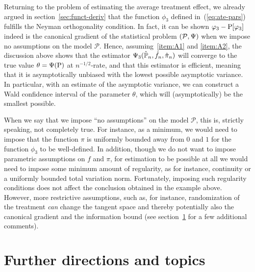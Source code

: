 \documentclass[a4,danish]{article}
\begin{document}
\begin{example}
  \label{example:effi-ate}
  Returning to the problem of estimating the average treatment effect, we already argued in
  section~\ref{sec:funct-deriv} that the function $\phi_3$ defined in~(\ref{eq:ate-pars}) fulfills
  the Neyman orthogonality condition. In fact, it can be shown $\phi_3 - \P[\phi_3]$ indeed is the
  canonical gradient of the statistical problem $(\mathcal{P}, \TT)$ when we impose no assumptions
  on the model $\mathcal{P}$. Hence, assuming~\ref{item:A1} and \ref{item:A2}, the discussion above
  shows that the estimator $\TT_3(\empmeas, \hat{f}_n, \hat{\pi}_n)$ will converge to the true value
  $\theta=\TT(\P)$ at $n^{-1/2}$-rate, and that this estimator is efficient, meaning that it is
  asymptotically unbiased with the lowest possible asymptotic variance. In particular, with an
  estimate of the asymptotic variance, we can construct a Wald confidence interval of the parameter
  $\theta$, which will (asymptotically) be the smallest possible. 
\end{example}

\begin{remark}
  When we say that we impose ``no assumptions'' on the model $\mathcal{P}$, this is, strictly
  speaking, not completely true. For instance, as a minimum, we would need to impose that the
  function $\pi$ is uniformly bounded away from $0$ and $1$ for the function $\phi_3$ to be
  well-defined. In addition, though we do not want to impose parametric assumptions on $f$ and
  $\pi$, for estimation to be possible at all we would need to impose some minimum amount of
  regularity, as for instance, continuity or a uniformly bounded total variation norm. Fortunately,
  imposing such regularity conditions does not affect the conclusion obtained in the example above.
  However, more restrictive assumptions, such as, for instance, randomization of the treatment
  \textit{can} change the tangent space and thereby potentially also the canonical gradient and the
  information bound (see section~\ref{sec:further-directions} for a few additional comments).
\end{remark} 

\section{Further directions and topics}
\label{sec:further-directions}
\end{document}
